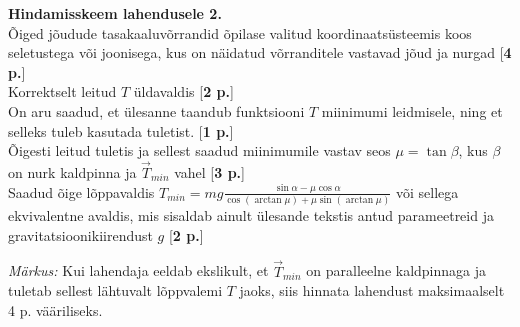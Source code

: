 \textbf{Hindamisskeem lahendusele 2.} \\
Õiged jõudude tasakaaluvõrrandid õpilase valitud koordinaatsüsteemis koos seletustega või joonisega, kus on näidatud võrranditele vastavad jõud ja nurgad [\textbf{4 p.}]\\
Korrektselt leitud $T$ üldavaldis [\textbf{2 p.}]\\
On aru saadud, et ülesanne taandub funktsiooni $T$ miinimumi leidmisele, ning et selleks tuleb kasutada tuletist. [\textbf{1 p.}]\\
Õigesti leitud tuletis ja sellest saadud miinimumile vastav seos $\mu=\tan\beta$, kus $\beta$ on nurk kaldpinna ja $\overrightarrow{T}_{min}$ vahel [\textbf{3 p.}]\\
Saadud õige lõppavaldis $T_{min}=mg\frac{\sin\alpha-\mu\cos\alpha}{\cos(\arctan\mu)+\mu\sin(\arctan\mu)}$ või sellega ekvivalentne avaldis, mis sisaldab ainult ülesande tekstis antud parameetreid
ja gravitatsioonikiirendust $g$ [\textbf{2 p.}]

\emph{Märkus:} Kui lahendaja eeldab ekslikult, et $\overrightarrow{T}_{min}$ on paralleelne kaldpinnaga ja tuletab sellest lähtuvalt lõppvalemi $T$ jaoks, siis hinnata lahendust
maksimaalselt 4 p. vääriliseks.
\probend